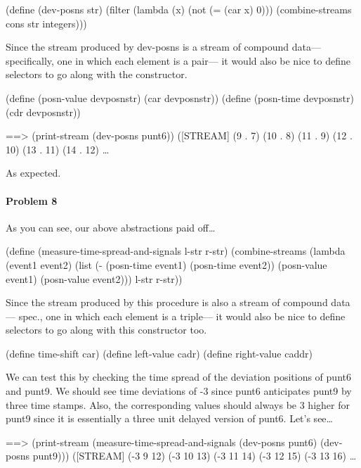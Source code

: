 \beginlisp
(define (dev-posns str)
  (filter (lambda (x) (not (= (car x) 0)))
          (combine-streams cons str integers)))
\endlisp

Since the stream produced by {\cf dev-posns} is a stream of compound data---
specifically, one in which each element is a pair--- it would also be
nice to define selectors to go along with the constructor.

\beginlisp
(define (posn-value devposnstr) (car devposnstr))
(define (posn-time  devposnstr) (cdr devposnstr))
\endlisp

\beginlisp
==> (print-stream (dev-posns punt6))
([STREAM] (9 . 7) (10 . 8) (11 . 9) (12 . 10) (13 . 11) (14 . 12) \ldots
\endlisp

As expected.

\paragraph{Problem 8}

As you can see, our above abstractions paid off\ldots

\beginlisp
(define (measure-time-spread-and-signals l-str r-str)
  (combine-streams (lambda (event1 event2)
                     (list (- (posn-time event1)
                              (posn-time event2))
                           (posn-value event1)
                           (posn-value event2)))
                   l-str
                   r-str))
\endlisp

Since the stream produced by this procedure is also a stream of compound
data--- spec., one in which each element is a triple--- it would also be
nice to define selectors to go along with this constructor too.

\beginlisp
(define  time-shift car)
(define  left-value cadr)
(define right-value caddr)
\endlisp

We can test this by checking the time spread of the deviation positions of {\cf
punt6} and {\cf punt9}. We should see time deviations of -3 since {\cf punt6}
anticipates {\cf punt9} by three time stamps. Also, the corresponding values
should always be 3 higher for {\cf punt9} since it is essentially a three unit
delayed version of {\cf punt6}. Let's see\ldots

\beginlisp
==> (print-stream (measure-time-spread-and-signals (dev-posns punt6) (dev-posns punt9)))
([STREAM] (-3 9 12) (-3 10 13) (-3 11 14) (-3 12 15) (-3 13 16) \ldots
\endlisp

